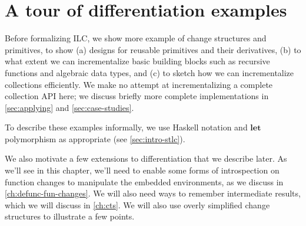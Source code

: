 









\def\deriveDefCore{%
\begin{align*}
  \ensuremath{\Derive{\lambda (\Varid{x}\typcolon\sigma)\to \Varid{t}}} &= \ensuremath{\lambda (\Varid{x}\typcolon\sigma)\;(\Varid{dx}\typcolon\Delta \sigma)\to \Derive{\Varid{t}}} \\
  \ensuremath{\Derive{\Varid{s}\;\Varid{t}}} &= \ensuremath{\Derive{\Varid{s}}\;\Varid{t}\;\Derive{\Varid{t}}} \\
  \ensuremath{\Derive{\Varid{x}}} &= \ensuremath{\Varid{dx}} \\
  \ensuremath{\Derive{\Varid{c}}} &= \ensuremath{\DeriveConst{\Varid{c}}}
\end{align*}
}




\chapter{A tour of differentiation examples}
\label{ch:diff-examples}
Before formalizing ILC, we show more example of change structures and
primitives, to show (a) designs for reusable primitives and their
derivatives, (b) to what extent we can incrementalize basic building
blocks such as recursive functions and algebraic data types, and (c) to sketch how
we can incrementalize collections efficiently. We make no attempt at
incrementalizing a complete collection API here; we discuss briefly more
complete implementations in \cref{sec:applying} and \cref{sec:case-studies}.

To describe these examples informally, we use Haskell notation and
\ensuremath{\mathbf{let}} polymorphism as appropriate (see \cref{sec:intro-stlc}).

We also motivate a few extensions to differentiation that we describe later. As
we'll see in this chapter, we'll need to enable some forms of introspection on
function changes to manipulate the embedded environments, as we discuss in
\cref{ch:defunc-fun-changes}. We will also need ways to remember intermediate
results, which we will discuss in \cref{ch:cts}.
We will also use overly simplified change structures to illustrate a few points.

